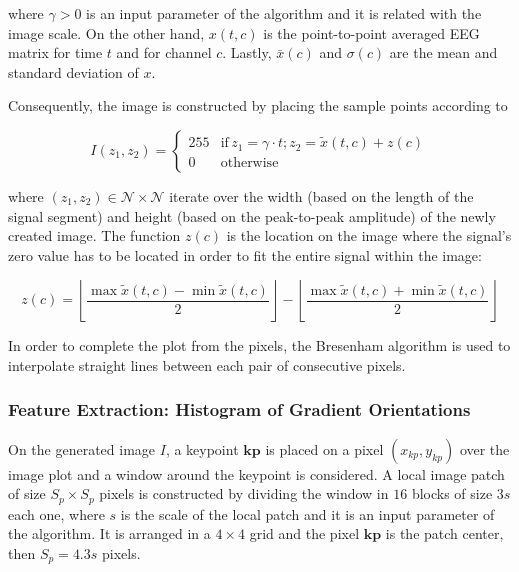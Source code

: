 \documentclass[entropy,article,submit,moreauthors,pdftex,10pt,a4paper]{mdpi}
\begin{document}
\noindent where $\gamma > 0$ is an input parameter of the algorithm and  it is related with the image scale. On the other hand, $ x(t,c) $ is the point-to-point averaged EEG matrix for time $t$ and for channel $c$. Lastly, $\bar{x}(c)$ and $ \sigma (c) $ are the mean and standard deviation of $x$.

Consequently, the image is constructed by placing the sample points according to

\begin{equation}
I(z_1,z_2) = \left\{ \begin{array}{rl}
255 & \text{if} \,  z_1 = \gamma \cdot t; z_2 = \tilde{x}(t,c) + z(c) \\
0   & \mbox{otherwise}
\end{array}\right.
\label{eq:images}
\end{equation}

\noindent where $ (z_1,z_2) \in \mathcal{N} \times \mathcal{N}$ iterate over the width (based on the length of the signal segment) and height (based on the peak-to-peak amplitude) of the newly created image.  The function $z(c)$ is the location on the image where the signal's zero value has to be located in order to fit the entire signal within the image:

\begin{equation}
z(c) = \left \lfloor{ \frac{\max \tilde{x}(t,c)  - \min \tilde{x}(t,c) }{2} }\right \rfloor -   \left \lfloor{ \frac{\max \tilde{x}(t,c)  + \min \tilde{x}(t,c)}{ 2} }\right \rfloor
\label{eq:zerolevel}
\end{equation}
  
In order to complete the plot from the pixels, the Bresenham \citep{Bresenham1965,Ramele2016} algorithm is used to interpolate straight lines between each pair of  consecutive pixels.


\subsubsection{Feature Extraction: Histogram of Gradient Orientations}
\label{SIFT}


On the generated image $I$, a keypoint $\mathbf{kp}$ is placed on a pixel $(x_{kp}, y_{kp})$ over the image plot and a window around the keypoint is considered. A local image patch of size $S_p \times S_p$ pixels is constructed by dividing the window in $16$ blocks of size $3s$ each one,  where $s$ is the scale of the local patch and it is an input parameter of the algorithm. It is arranged in a $4 \times 4$ grid and the pixel $ \mathbf{kp}$ is the patch center, then $S_p = 4.3s $ pixels. 
\end{document}
